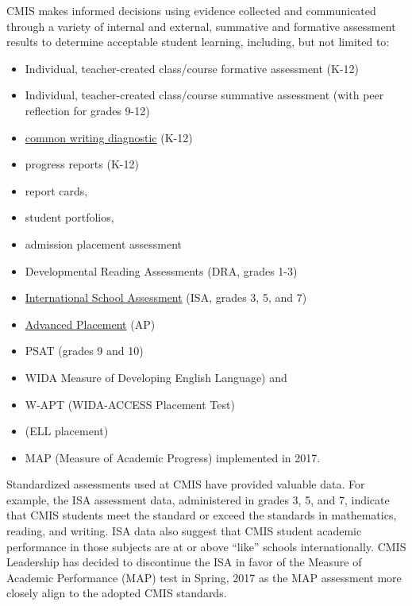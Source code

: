 \documentclass{report}
\begin{document}
\begin{findings}
CMIS makes informed decisions using evidence collected and communicated through a variety of internal and external, summative and formative assessment results to determine acceptable student learning, including, but not limited to:

\begin{itemize}
\item Individual, teacher-created class/course formative  assessment (K-12)
\item Individual, teacher-created class/course summative assessment (with peer reflection for grades 9-12)
\item \href{https://drive.google.com/drive/folders/0ByVFfrm0zfolLU9Vb0ZBeF9uZjQ?usp=sharing}{common writing diagnostic} (K-12)
\item progress reports (K-12)
\item report cards, 
\item student portfolios, 
\item admission placement assessment 
\item Developmental Reading Assessments (DRA, grades 1-3)
\item \href{https://drive.google.com/drive/folders/0ByVFfrm0zfolfm8tU3BMY1BpVjZaSmpUbUs5aFp5UmM3dm14QXIwV0hEVnhKVGRMV2g4ZU0?usp=sharing}{International School Assessment} (ISA, grades 3, 5, and 7) 
\item \href{https://drive.google.com/a/cmis.ac.th/file/d/0Bw0VZdQtZdSRZkI0bElJZDRuUGg5ZEtaa1ZyWDBwdk5vYWtV/view?usp=sharing}{Advanced Placement} (AP)
\item PSAT (grades 9 and 10)
\item WIDA Measure of Developing English Language) and 
\item W-APT (WIDA-ACCESS Placement Test)
\item (ELL placement)
\item MAP (Measure of Academic Progress) implemented in 2017. 
\end{itemize}
Standardized assessments used at CMIS have provided valuable data. For example, the ISA assessment data, administered in grades 3, 5, and 7, indicate that CMIS students meet the standard or exceed the standards in mathematics, reading, and writing. ISA data also suggest that CMIS student academic performance in those subjects are at or above “like” schools internationally. CMIS Leadership has decided to discontinue the ISA in favor of the Measure of Academic Performance (MAP) test in Spring, 2017 as the MAP assessment more closely align to the adopted CMIS standards. 


\end{findings}
\end{document}

